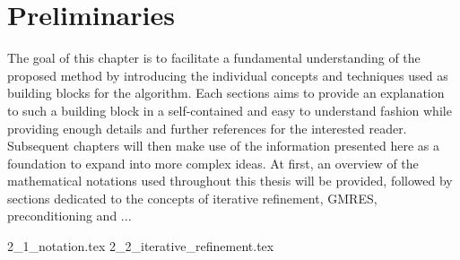 \chapter{Preliminaries}
\label{chap:preliminaries}

The goal of this chapter is to facilitate a fundamental understanding of the proposed method by introducing the individual concepts and techniques used as building blocks for the algorithm. Each sections aims to provide an explanation to such a building block in a self-contained and easy to understand fashion while providing enough details and further references for the interested reader. Subsequent chapters will then make use of the information presented here as a foundation to expand into more complex ideas. At first, an overview of the mathematical notations used throughout this thesis will be provided, followed by sections dedicated to the concepts of iterative refinement, GMRES, preconditioning and ...

{2_1_notation.tex}
{2_2_iterative_refinement.tex}